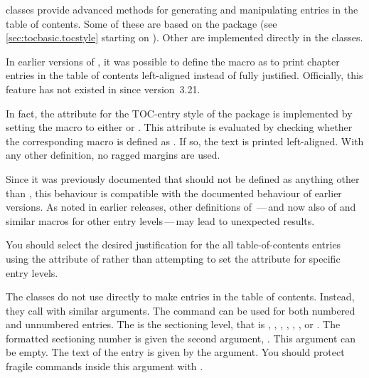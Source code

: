 \KOMAScript{} classes provide advanced methods for generating and
manipulating entries in the table of contents. Some of these are based on
the  package (see \autoref{sec:tocbasic.tocstyle} starting
on ). Other are implemented directly in the
classes.

\begin{Declaration}
\end{Declaration}
In earlier versions of
\KOMAScript{}, it was possible to define the  macro
as  to print chapter entries in the table of contents
left-aligned instead of fully justified. Officially, this feature has not
existed in \KOMAScript{} since version~3.21.

In fact, the  attribute for the 
TOC-entry style of the  package is
implemented by setting the  macro to
either  or . This attribute is evaluated by
checking whether the corresponding macro is defined as . If
so, the text is printed left-aligned. With any other definition, no ragged
margins are used.

Since it was previously documented that  should not
be defined as anything other than , this behaviour is
compatible with the documented behaviour of earlier versions. As noted in
earlier releases, other definitions of \,---\,and
now also of  and similar macros for other entry
levels\,---\,may lead to unexpected results.

You should select the desired justification for the all table-of-contents
entries using the  attribute of 
rather than attempting to set the attribute for specific entry levels.%
\EndIndexGroup


\begin{Declaration}
\end{Declaration}
The \KOMAScript{} classes do not use
%
 directly to make entries in the table of
contents. Instead, they call  with similar
arguments. The command can be used for both numbered and unnumbered entries.
The  is the sectioning level, that is ,
, , ,
, , or . The
formatted sectioning number is given the second argument, . This
argument can be empty. The text of the entry is given by the 
argument. You should protect fragile commands inside this argument with
.

